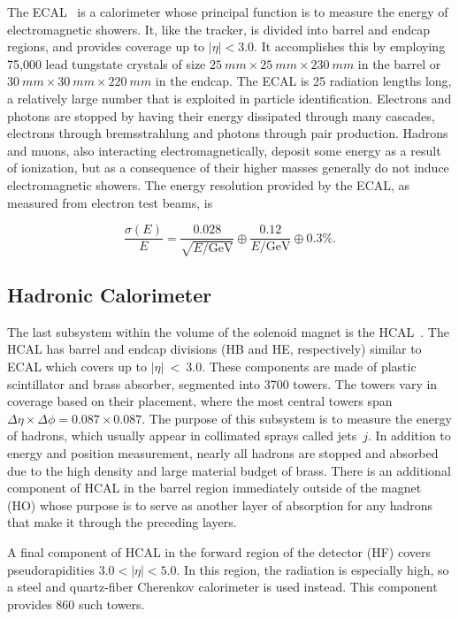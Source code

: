 The ECAL~\cite{ecaltdr} is a calorimeter whose principal function is to measure the energy of electromagnetic showers.
It, like the tracker, is divided into barrel and endcap regions, and provides coverage up to
$|\eta| < 3.0$.
It accomplishes this by employing 75,000 lead tungstate crystals of size
$25~mm \times 25~mm \times 230~mm$ in the barrel or $30~mm \times 30~mm \times 220~mm$ in the endcap.
The ECAL is 25 radiation lengths long, a relatively large number that is exploited in
particle identification. Electrons and photons are stopped by having their energy dissipated
through many cascades, electrons through bremsstrahlung and photons through pair production.
Hadrons and muons, also interacting electromagnetically, deposit some energy as a result of ionization,
but as a consequence of their higher masses generally do not induce electromagnetic showers.
The energy resolution provided by the ECAL, as measured from electron test beams, is

\begin{equation}
\frac{\sigma(E)}{E} = \frac{0.028}{\sqrt{E/\textrm{GeV}}} \oplus \frac{0.12}{E/\textrm{GeV}} \oplus 0.3\% .
\end{equation}

\subsection{Hadronic Calorimeter\label{subsec:hcal}}

The last subsystem within the volume of the solenoid magnet is the HCAL~\cite{hcaltdr}.
The HCAL has barrel and endcap divisions (HB and HE, respectively) similar to ECAL which
covers up to $|\eta|~<~3.0$.
These components are made of plastic scintillator and brass absorber, segmented into 3700 towers. The
towers vary in coverage based on their placement, where the most central towers span
$\Delta\eta \times \Delta\phi = 0.087 \times 0.087$. The purpose of this subsystem is to
measure the energy of hadrons, which usually appear in collimated sprays called jets~$j$. In addition
to energy and position measurement, nearly all hadrons are stopped and absorbed due to the
high density and large material budget of brass. There is an additional component of HCAL
in the barrel region immediately outside of the magnet (HO) whose purpose is to serve as another
layer of absorption for any hadrons that make it through the preceding layers.

A final component of HCAL in the forward region of the detector (HF)
covers pseudorapidities $3.0 < |\eta|< 5.0$. In this region, the
radiation is especially high, so a steel and quartz-fiber Cherenkov calorimeter is used instead.
This component provides 860 such towers.

